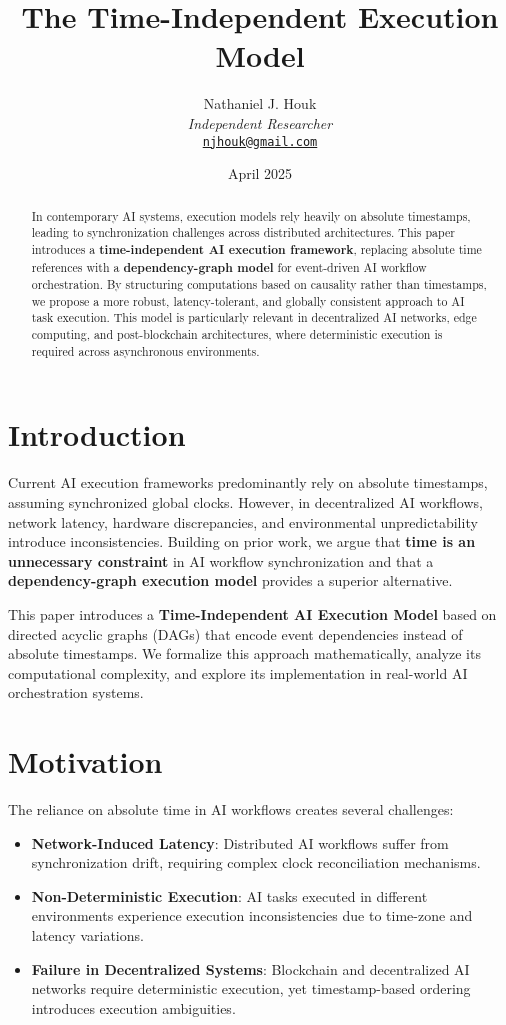 \documentclass{article}
\title{The Time-Independent Execution Model}
\author{Nathaniel J. Houk\\
\textit{Independent Researcher}\\
\href{mailto:njhouk@gmail.com}{\texttt{njhouk@gmail.com}}}
\date{April 2025}
\begin{document}
\maketitle
\tableofcontents

\begin{abstract}
In contemporary AI systems, execution models rely heavily on absolute timestamps, leading to synchronization challenges across distributed architectures. This paper introduces a \textbf{time-independent AI execution framework}, replacing absolute time references with a \textbf{dependency-graph model} for event-driven AI workflow orchestration. By structuring computations based on causality rather than timestamps, we propose a more robust, latency-tolerant, and globally consistent approach to AI task execution. This model is particularly relevant in decentralized AI networks, edge computing, and post-blockchain architectures, where deterministic execution is required across asynchronous environments\cite{houk2025time}.
\end{abstract}

\section{Introduction}
Current AI execution frameworks predominantly rely on absolute timestamps, assuming synchronized global clocks. However, in decentralized AI workflows, network latency, hardware discrepancies, and environmental unpredictability introduce inconsistencies. Building on prior work\cite{houk2025time}, we argue that \textbf{time is an unnecessary constraint} in AI workflow synchronization and that a \textbf{dependency-graph execution model} provides a superior alternative.

This paper introduces a \textbf{Time-Independent AI Execution Model} based on directed acyclic graphs (DAGs) that encode event dependencies instead of absolute timestamps. We formalize this approach mathematically, analyze its computational complexity, and explore its implementation in real-world AI orchestration systems\cite{Lamport1978}.

\section{Motivation}
The reliance on absolute time in AI workflows creates several challenges:
\begin{itemize}
    \item \textbf{Network-Induced Latency}: Distributed AI workflows suffer from synchronization drift, requiring complex clock reconciliation mechanisms.
    \item \textbf{Non-Deterministic Execution}: AI tasks executed in different environments experience execution inconsistencies due to time-zone and latency variations.
    \item \textbf{Failure in Decentralized Systems}: Blockchain and decentralized AI networks require deterministic execution, yet timestamp-based ordering introduces execution ambiguities.
\end{itemize}
\end{document}
